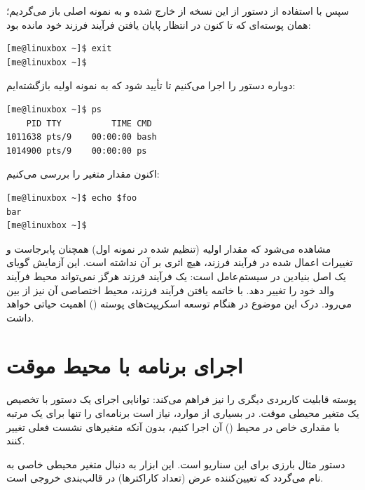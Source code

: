 سپس با استفاده از دستور  از این نسخه از  خارج شده و به نمونه اصلی باز می‌گردیم؛ همان پوسته‌ای که تا کنون در انتظار پایان یافتن فرآیند فرزند خود مانده بود:

\begin{latin}
\begin{lstlisting}
[me@linuxbox ~]$ exit
[me@linuxbox ~]$
\end{lstlisting}
\end{latin}

دوباره دستور  را اجرا می‌کنیم تا تأیید شود که به نمونه اولیه بازگشته‌ایم:

\begin{latin}
\begin{lstlisting}
[me@linuxbox ~]$ ps
    PID TTY          TIME CMD
1011638 pts/9    00:00:00 bash
1014900 pts/9    00:00:00 ps
\end{lstlisting}
\end{latin}

اکنون مقدار متغیر  را بررسی می‌کنیم:

\begin{latin}
\begin{lstlisting}
[me@linuxbox ~]$ echo $foo
bar
[me@linuxbox ~]$
\end{lstlisting}
\end{latin}

مشاهده می‌شود که مقدار اولیه (تنظیم شده در نمونه اول) همچنان پابرجاست و تغییرات اعمال شده در فرآیند فرزند، هیچ اثری بر آن نداشته است. این آزمایش گویای یک اصل بنیادین در سیستم‌عامل است: یک فرآیند فرزند هرگز نمی‌تواند محیط فرآیند والد خود را تغییر دهد. با خاتمه یافتن فرآیند فرزند، محیط اختصاصی آن نیز از بین می‌رود. درک این موضوع در هنگام توسعه اسکریپت‌های پوسته () اهمیت حیاتی خواهد داشت.

\section{اجرای برنامه با محیط موقت}

پوسته قابلیت کاربردی دیگری را نیز فراهم می‌کند: توانایی اجرای یک دستور با تخصیص یک متغیر محیطی موقت. در بسیاری از موارد، نیاز است برنامه‌ای را تنها برای یک مرتبه با مقداری خاص در محیط () آن اجرا کنیم، بدون آنکه متغیرهای نشست فعلی تغییر کنند.

دستور  مثال بارزی برای این سناریو است. این ابزار به دنبال متغیر محیطی خاصی به نام  می‌گردد که تعیین‌کننده عرض (تعداد کاراکترها) در قالب‌بندی خروجی است.

